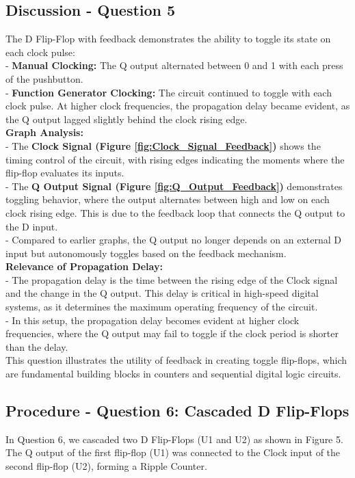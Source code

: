 \documentclass{article}
\begin{document}
    \subsection*{\textbf{Discussion - Question 5}}
    The D Flip-Flop with feedback demonstrates the ability to toggle its state on each clock pulse: \\ 
       - \textbf{Manual Clocking:} The Q output alternated between 0 and 1 with each press of the pushbutton. \\
       - \textbf{Function Generator Clocking:} The circuit continued to toggle with each clock pulse. At higher clock frequencies, the propagation delay became evident, as the Q output lagged slightly behind the clock rising edge. \\
    
    \textbf{Graph Analysis:} \\
       - The \textbf{Clock Signal (Figure \ref{fig:Clock_Signal_Feedback})} shows the timing control of the circuit, with rising edges indicating the moments where the flip-flop evaluates its inputs. \\
       - The \textbf{Q Output Signal (Figure \ref{fig:Q_Output_Feedback})} demonstrates toggling behavior, where the output alternates between high and low on each clock rising edge. This is due to the feedback loop that connects the Q output to the D input. \\ 
       - Compared to earlier graphs, the Q output no longer depends on an external D input but autonomously toggles based on the feedback mechanism. \\
    
    \textbf{Relevance of Propagation Delay:} \\
       - The propagation delay is the time between the rising edge of the Clock signal and the change in the Q output. This delay is critical in high-speed digital systems, as it determines the maximum operating frequency of the circuit. \\
       - In this setup, the propagation delay becomes evident at higher clock frequencies, where the Q output may fail to toggle if the clock period is shorter than the delay. \\
    
    This question illustrates the utility of feedback in creating toggle flip-flops, which are fundamental building blocks in counters and sequential digital logic circuits.
    

    \subsection*{\textbf{Procedure - Question 6: Cascaded D Flip-Flops}}
    In Question 6, we cascaded two D Flip-Flops (U1 and U2) as shown in Figure 5. The Q output of the first flip-flop (U1) was connected to the Clock input of the second flip-flop (U2), forming a Ripple Counter.
\end{document}
